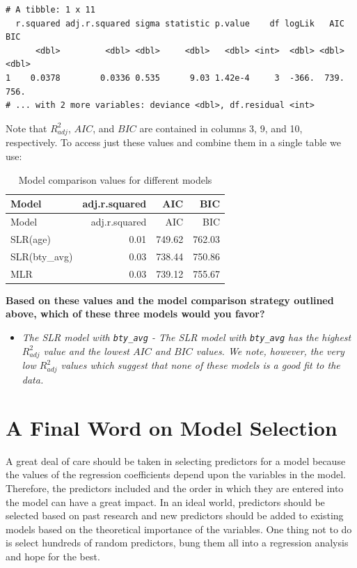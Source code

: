 \documentclass[]{article}
\providecommand{\tightlist}{%
  \setlength{\itemsep}{0pt}\setlength{\parskip}{0pt}}
\begin{document}
\begin{verbatim}
# A tibble: 1 x 11
  r.squared adj.r.squared sigma statistic p.value    df logLik   AIC   BIC
      <dbl>         <dbl> <dbl>     <dbl>   <dbl> <int>  <dbl> <dbl> <dbl>
1    0.0378        0.0336 0.535      9.03 1.42e-4     3  -366.  739.  756.
# ... with 2 more variables: deviance <dbl>, df.residual <int>
\end{verbatim}

Note that \(R^2_{adj}\), \(AIC\), and \(BIC\) are contained in columns
3, 9, and 10, respectively. To access just these values and combine them
in a single table we use:

\begin{longtable}[]{@{}lrrr@{}}
\caption{Model comparison values for different models}\tabularnewline
\toprule
Model & adj.r.squared & AIC & BIC\tabularnewline
\midrule
\endfirsthead
\toprule
Model & adj.r.squared & AIC & BIC\tabularnewline
\midrule
\endhead
SLR(age) & 0.01 & 749.62 & 762.03\tabularnewline
SLR(bty\_avg) & 0.03 & 738.44 & 750.86\tabularnewline
MLR & 0.03 & 739.12 & 755.67\tabularnewline
\bottomrule
\end{longtable}

\textbf{Based on these values and the model comparison strategy outlined
above, which of these three models would you favor?}

\begin{itemize}
\tightlist
\item
  \emph{The SLR model with \texttt{bty\_avg} - The SLR model with
  \texttt{bty\_avg} has the highest \(R^2_{adj}\) value and the lowest
  \(AIC\) and \(BIC\) values. We note, however, the very low
  \(R^2_{adj}\) values which suggest that none of these models is a good
  fit to the data.}
\end{itemize}

\newpage

\section{A Final Word on Model Selection}\label{sec:Final}

A great deal of care should be taken in selecting predictors for a model
because the values of the regression coefficients depend upon the
variables in the model. Therefore, the predictors included and the order
in which they are entered into the model can have a great impact. In an
ideal world, predictors should be selected based on past research and
new predictors should be added to existing models based on the
theoretical importance of the variables. One thing not to do is select
hundreds of random predictors, bung them all into a regression analysis
and hope for the best.
\end{document}
